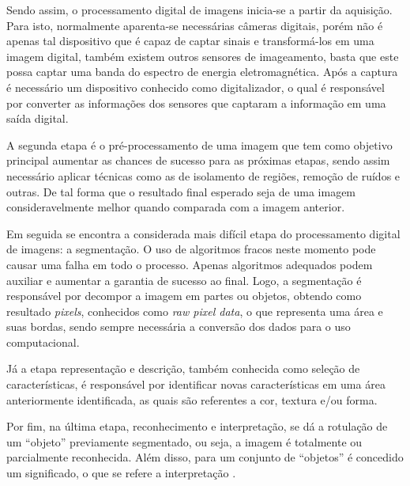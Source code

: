 \par Sendo assim, o processamento digital de imagens inicia-se a partir da aquisição. Para isto, normalmente aparenta-se necessárias câmeras digitais, porém não é apenas tal dispositivo que é capaz de captar sinais e transformá-los em uma imagem digital, também existem outros sensores de imageamento, basta que este possa captar uma banda do espectro de energia eletromagnética. Após a captura é necessário um dispositivo conhecido como digitalizador, o qual é responsável por converter as informações dos sensores que captaram a informação em uma saída digital.

\par A segunda etapa é o pré-processamento de uma imagem que tem como objetivo principal aumentar as chances de sucesso para as próximas etapas, sendo assim necessário aplicar técnicas como as de isolamento de regiões, remoção de ruídos e outras. De tal forma que o resultado final esperado seja de uma imagem consideravelmente melhor quando comparada com a imagem anterior.

\par Em seguida se encontra a considerada mais difícil etapa do processamento digital de imagens: a segmentação. O uso de algoritmos fracos neste momento pode causar uma falha em todo o processo. Apenas algoritmos adequados podem auxiliar e aumentar a garantia de sucesso ao final. Logo, a segmentação é responsável por decompor a imagem em partes ou objetos, obtendo como resultado \textit{pixels}, conhecidos como \textit{raw pixel data}, o que representa uma área e suas bordas, sendo sempre necessária a conversão dos dados para o uso computacional.

\par Já a etapa representação e descrição, também conhecida como seleção de características, é responsável por identificar novas características em uma área anteriormente identificada, as quais são referentes a cor, textura e/ou forma.

\par Por fim, na última etapa, reconhecimento e interpretação, se dá a rotulação de um ``objeto'' previamente segmentado, ou seja, a imagem é totalmente ou parcialmente reconhecida. Além disso, para um conjunto de ``objetos'' é concedido um significado, o que se refere a interpretação \cite{Gonzalez2009}.


